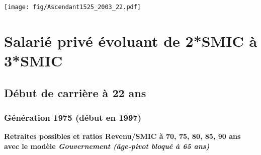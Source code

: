  \vspace{0.1cm} 

 \begin{center}\texttt{[image: fig/Ascendant1525\_2003\_22.pdf]}\end{center} \label{fig/Ascendant1525_2003_22.pdf} 

\newpage 
 
\chapter{Salarié privé évoluant de 2*SMIC à 3*SMIC} 


 \addto{\captionsenglish}{ \renewcommand{\mtctitle}{}} \setcounter{minitocdepth}{2} 
 \minitoc \newpage 

\section{Début de carrière à 22 ans} 

\subsection{Génération 1975 (début en 1997)} 

{\bf \noindent Retraites possibles et ratios Revenu/SMIC à 70, 75, 80, 85, 90 ans avec le modèle \emph{Gouvernement (âge-pivot bloqué à 65 ans)}}  
 
